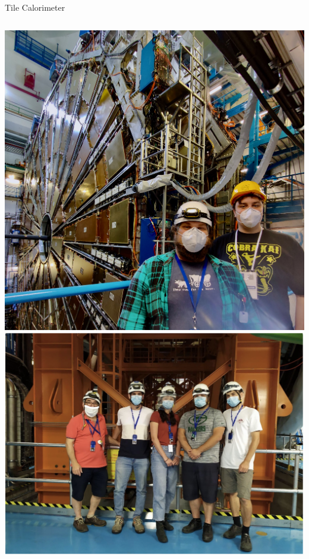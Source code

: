 \documentclass[aspectratio=169,xcolor=table]{beamer}
\begin{document}
\begin{frame}[t]{Tile Calorimeter}
\begin{columns}[t]
\begin{columns}
        \includegraphics[height=.33\textheight,keepaspectratio=true]{WillAndMeAtATLAS.jpeg}
        \includegraphics[height=.33\textheight,keepaspectratio=true]{TileMaintenanceTeamJune2020.png}

        \end{columns}
      \end{columns}
    \end{frame}
\end{document}
